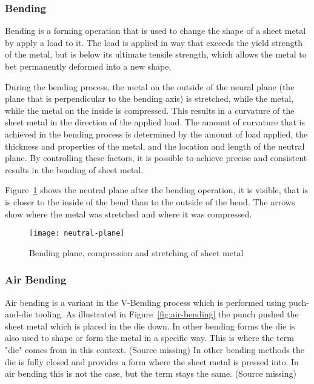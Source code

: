 \subsubsection{Bending}
Bending is a forming operation that is used to change the shape of a sheet metal by apply a load to it. 
The load is applied in way that exceeds the yield strength of the metal, but is below its ultimate tensile strength, which allows the metal to bet permanently deformed into a new shape. \cite[p. 1]{baig_machinelearningprediction_2021}

During the bending process, the metal on the outside of the neural plane (the plane that is perpendicular to the bending axis) is stretched, while the metal, while the metal on the inside is compressed. 
This results in a curvature of the sheet metal in the direction of the applied load.
\cite[p. 3]{baig_machinelearningprediction_2021}
The amount of curvature that is achieved in the bending process is determined by the amount of load applied, the thickness and properties of the metal, and the location and length of the neutral plane. By controlling these factors, it is possible to achieve precise and consistent results in the bending of sheet metal.

Figure~\ref{fig:neutral-plane} shows the neutral plane after the bending operation, it is visible, that is is closer to the inside of the bend than to the outside of the bend. 
The arrows show where the metal was stretched and where it was compressed.


\begin{figure}[H]
    \centering
    \texttt{[image: neutral-plane]}
    \caption{Bending plane, compression and stretching of sheet metal \cite[p. 3]{baig_machinelearningprediction_2021}}
    \label{fig:neutral-plane}
\end{figure}

\subsubsection{Air Bending}
Air bending is a variant in the V-Bending process which is performed using puch-and-die tooling. \cite[p. 416]{groover_fundamentalsmodernmanufacturing_2020} 
As illustrated in Figure~\ref{fig:air-bending} the punch pushed the sheet metal which is placed in the die down.
In other bending forms the die is also used to shape or form the metal in a specific way. This is where the term "die" comes from in this context. (Source missing)
In other bending methods the die is fully closed and provides a form where the sheet metal is pressed into. In air bending this is not the case, but the term stays the same. (Source missing)

